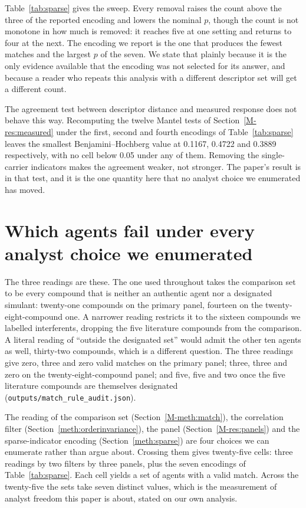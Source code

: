 \documentclass[11pt,a4paper]{article}
\begin{document}
Table~\ref{tab:sparse} gives the sweep. Every removal raises the count above
the three of the reported encoding and lowers the nominal $p$, though the count
is not monotone in how much is removed: it reaches five at one setting and
returns to four at the next. The
encoding we report is the one that produces the fewest matches and the largest
$p$ of the seven. We state that plainly because it is the only evidence
available that the encoding was not selected for its answer, and because a
reader who repeats this analysis with a different descriptor set will get a
different count.

The agreement test between descriptor distance and measured response does not
behave this way. Recomputing the twelve Mantel tests of
Section~\ref{M-res:measured} under the first, second and fourth encodings of
Table~\ref{tab:sparse} leaves the smallest Benjamini--Hochberg value at 0.1167,
0.4722 and 0.3889 respectively, with no cell below 0.05 under any of them.
Removing the single-carrier indicators makes the agreement weaker, not
stronger. The paper's result is in that test, and it is the one quantity here
that no analyst choice we enumerated has moved.

\section{Which agents fail under every analyst choice we enumerated}
\label{meth:failaudit}

The three readings are these. The one used throughout takes the comparison set
to be every compound that is neither an authentic agent nor a designated
simulant: twenty-one compounds on the primary panel, fourteen on the
twenty-eight-compound one. A narrower reading restricts it to the sixteen
compounds we labelled interferents, dropping the five literature compounds from
the comparison. A literal reading of ``outside the designated set'' would admit
the other ten agents as well, thirty-two compounds, which is a different
question. The three readings give zero, three and zero valid matches on the primary
panel; three, three and zero on the twenty-eight-compound panel; and five, five
and two once the five literature compounds are themselves designated
(\texttt{outputs/match\_rule\_audit.json}).

The reading of the comparison set (Section~\ref{M-meth:match}), the correlation
filter (Section~\ref{meth:orderinvariance}), the panel (Section~\ref{M-res:panels})
and the sparse-indicator encoding (Section~\ref{meth:sparse}) are four choices
we can enumerate rather than argue about. Crossing them gives twenty-five
cells: three readings by two filters by three panels, plus the seven encodings
of Table~\ref{tab:sparse}. Each cell yields a set of agents with a valid match.
Across the twenty-five the sets take seven distinct values, which is the
measurement of analyst freedom this paper is about, stated on our own analysis.
\end{document}
